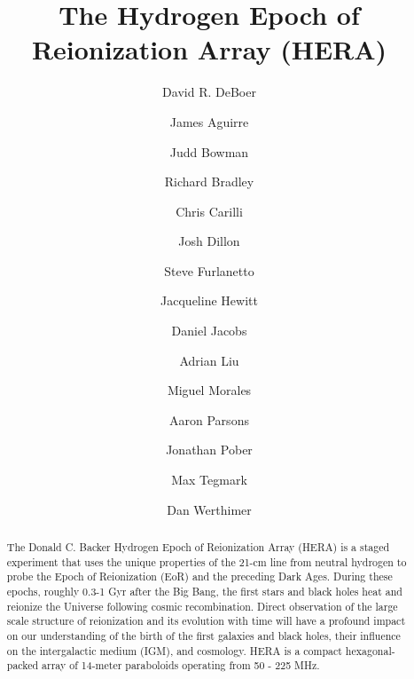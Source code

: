 \documentclass[ars]{copernicus}
\begin{document}
\linenumbers

\title{The Hydrogen Epoch of Reionization Array (HERA)}

\author[1]{David R. DeBoer}
\author[2]{James Aguirre}
\author[3]{Judd Bowman}
\author[4]{Richard Bradley}
\author[4]{Chris Carilli}
\author[5]{Josh Dillon}
\author[6]{Steve Furlanetto}
\author[5]{Jacqueline Hewitt}
\author[3]{Daniel Jacobs}
\author[1]{Adrian Liu}
\author[7]{Miguel Morales}
\author[1]{Aaron Parsons}
\author[7]{Jonathan Pober}
\author[5]{Max Tegmark}
\author[1]{Dan Werthimer}






\received{}
\pubdiscuss{} %
\revised{}
\accepted{}
\published{}




\maketitle 

\begin{abstract}
The Donald C. Backer Hydrogen Epoch of Reionization Array (HERA) is a staged
experiment that uses the unique properties of the 21-cm line from neutral
hydrogen to probe the Epoch of Reionization (EoR) and the preceding Dark
Ages. During these epochs, roughly 0.3-1 Gyr after the Big Bang, the first
stars and black holes heat and reionize the Universe following cosmic
recombination. Direct observation of the large scale structure of
reionization and its evolution with time will have
a profound impact on our understanding of the birth of the first galaxies
and black holes, their influence on the intergalactic medium (IGM), and
cosmology.  HERA is a compact hexagonal-packed array of 14-meter paraboloids 
operating from 50 - 225 MHz.
\end{abstract}
\end{document}
